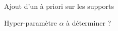 \begin{frame}{Ajout d'un à priori sur les supports}
\begin{figure}\centering
\end{figure}
\begin{exampleblock}{} \centering 
Hyper-paramètre \alert{$\alpha$} à déterminer ?
\end{exampleblock}
\end{frame}


